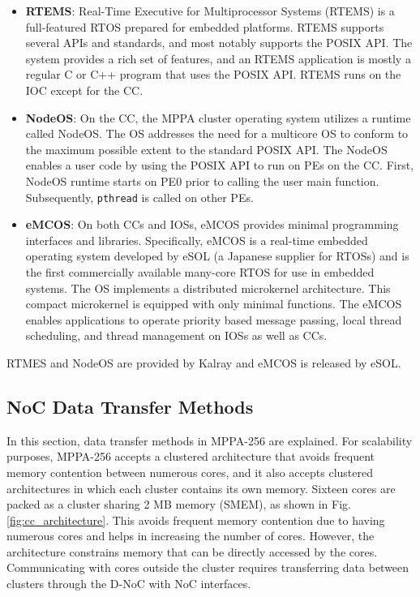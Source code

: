 \begin{itemize}
  \setlength{\leftskip}{-5mm}    
  \item \textbf{RTEMS}: Real-Time Executive for Multiprocessor Systems (RTEMS) is a full-featured RTOS prepared for embedded platforms.
  RTEMS supports several APIs and standards, and most notably supports the POSIX API.
  The system provides a rich set of features, and an RTEMS application is mostly a regular C or C++ program that uses the POSIX API.
  RTEMS runs on the IOC except for the CC.
  
  \item \textbf{NodeOS}: On the CC, the MPPA cluster operating system utilizes a runtime called NodeOS.
  The OS addresses the need for a multicore OS to conform to the maximum possible extent to the standard POSIX API.
  The NodeOS enables a user code by using the POSIX API to run on PEs on the CC.
  First, NodeOS runtime starts on PE0 prior to calling the user main function.
  Subsequently, \texttt{pthread} is called on other PEs.
  
  \item \textbf{eMCOS}: On both CCs and IOSs, eMCOS provides minimal programming interfaces and libraries.
  Specifically, eMCOS is a real-time embedded operating system developed by eSOL (a Japanese supplier for RTOSs) and is the first commercially available many-core RTOS for use in embedded systems.
  The OS implements a distributed microkernel architecture.
  This compact microkernel is equipped with only minimal functions.
  The eMCOS enables applications to operate priority based message passing, local thread scheduling, and thread management on IOSs as well as CCs.
\end{itemize}

RTMES and NodeOS are provided by Kalray and eMCOS is released by eSOL.

\subsection{NoC Data Transfer Methods}
\label{sec:data_transfer_methods}
In this section, data transfer methods in MPPA-256 are explained.
For scalability purposes, MPPA-256 accepts a clustered architecture that avoids frequent memory contention between numerous cores, and it also accepts clustered architectures in which each cluster contains its own memory.
Sixteen cores are packed as a cluster sharing 2 MB memory (SMEM), as shown in Fig. \ref{fig:cc_architecture}.
This avoids frequent memory contention due to having numerous cores and helps in increasing the number of cores.
However, the architecture constrains memory that can be directly accessed by the cores.
Communicating with cores outside the cluster requires transferring data between clusters through the D-NoC with NoC interfaces.

